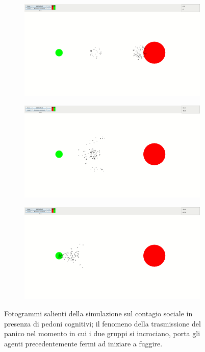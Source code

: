 \begin{figure}
    \centering
    \begin{subfigure}[b]{0.75\textwidth}
        \centering
        \includegraphics[width=\textwidth]{immagini/casi-studio/social-contagion-cognitive-begin.png}
    \end{subfigure}
    \hfill
    \begin{subfigure}[b]{0.75\textwidth}
        \centering
        \includegraphics[width=\textwidth]{immagini/casi-studio/social-contagion-cognitive-during.png}
    \end{subfigure}
    \hfill
    \begin{subfigure}[b]{0.75\textwidth}
        \centering
        \includegraphics[width=\textwidth]{immagini/casi-studio/social-contagion-cognitive-end.png}
    \end{subfigure}
    \caption{Fotogrammi salienti della simulazione sul contagio sociale in presenza di pedoni cognitivi; il fenomeno della trasmissione del panico nel momento in cui i due gruppi si incrociano, porta gli agenti precedentemente fermi ad iniziare a fuggire.}
    \label{fig:social-contagion-cognitive}
\end{figure}